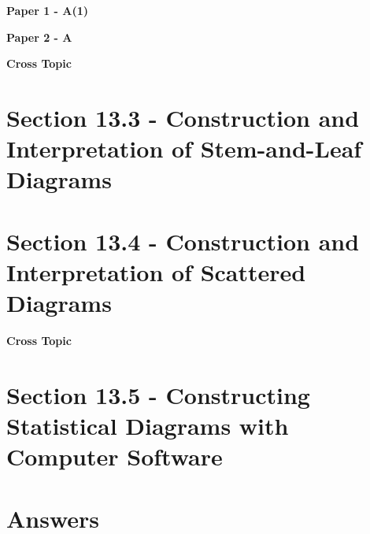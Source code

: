\documentclass[12pt, a4paper]{article}
\begin{document}
\textbf{Paper 1 - A(1)}
\begin{enumx}[label=\arabic*.,start=1]
\item {}\label{DSE2012S-CoreP1-Q09} 
\end{enumx}
\textbf{Paper 2 - A}
\begin{enumx}[label=\arabic*.,start=2]
\item {}\label{DSE2013-CoreP2-Q30} 
\item {}\label{DSE2014-CoreP2-Q29} 
\end{enumx}
\textbf{Cross Topic}
\begin{enumx}[label=\arabic*.,start=4]
\item {}\label{DSE2017-CoreP1-Q07} 
\end{enumx}




\section*{Section 13.3 - Construction and Interpretation of Stem-and-Leaf Diagrams}\label{section:1-13-3}





\section*{Section 13.4 - Construction and Interpretation of Scattered Diagrams}\label{section:1-13-4}

\textbf{Cross Topic}
\begin{enumx}[label=\arabic*.,start=5]
\item {}\label{DSE2013-CoreP2-Q28} 
\end{enumx}




\section*{Section 13.5 - Constructing Statistical Diagrams with Computer Software}\label{section:1-13-5}

\section*{Answers}
\begin{enumx}[label=\arabic*.,start=1]
\item {}
\item {}
\item {}
\item {}
\item {}
\end{enumx}
\end{document}
